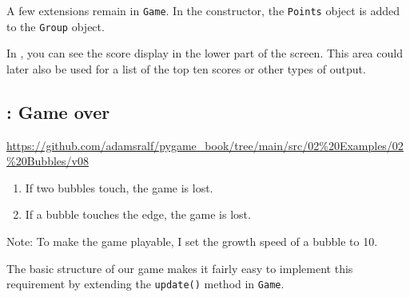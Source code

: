 
A few extensions remain in \texttt{Game}. In the constructor, the \texttt{Points} object is added to the \texttt{Group} object.



In , you can see the score display in the lower part of the screen. This area could later also be used for a list of the top ten scores or other types of output.

\subsection{: Game over}
\begin{diskbox}
	\url{https://github.com/adamsralf/pygame_book/tree/main/src/02%20Examples/02%20Bubbles/v08}
\end{diskbox}

\begin{enumerate}
	\item If two bubbles touch, the game is lost.\label{reqSpielendeBlase}
	\item If a bubble touches the edge, the game is lost.\label{reqSpielendeRand}
\end{enumerate}
\er

Note: To make the game playable, I set the growth speed of a bubble to 10.


The basic structure of our game makes it fairly easy to implement this requirement by extending the \texttt{update()} method in \texttt{Game}.



